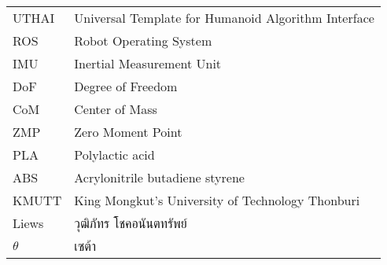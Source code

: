 \begin{abbreviations}
    \noindent
    \begin{tabular*}{\textwidth}{@{}p{}p{}@{}}
        {UTHAI} & {Universal Template for Humanoid Algorithm Interface} \\
        {ROS} & {Robot Operating System} \\
        {IMU} & {Inertial Measurement Unit} \\
        {DoF} & {Degree of Freedom} \\
        {CoM} & {Center of Mass} \\
        {ZMP} & {Zero Moment Point} \\
        {PLA} & {Polylactic acid} \\
        {ABS} & {Acrylonitrile butadiene styrene} \\
        {KMUTT} & {King Mongkut's University of Technology Thonburi} \\
        {Liews} & {วุฒิภัทร โชคอนันตทรัพย์} \\
        {$\theta$} & {เซต้า}
    \end{tabular*}
\end{abbreviations}
